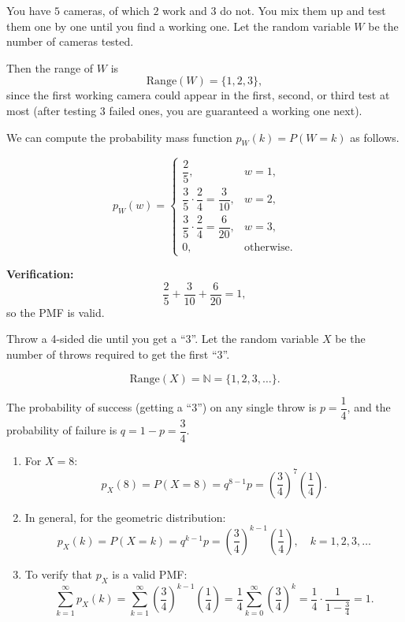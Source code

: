 \begin{eg}
You have \(5\) cameras, of which \(2\) work and \(3\) do not.  
You mix them up and test them one by one until you find a working one.  
Let the random variable \(W\) be the number of cameras tested.

Then the range of \(W\) is
\[
\text{Range}(W) = \{1,2,3\},
\]
since the first working camera could appear in the first, second, or third test at most (after testing \(3\) failed ones, you are guaranteed a working one next).

We can compute the probability mass function \(p_W(k) = P(W = k)\) as follows.

\[
p_W(w) =
\begin{cases}
\dfrac{2}{5}, & w = 1, \\[1em]
\dfrac{3}{5}\cdot\dfrac{2}{4} = \dfrac{3}{10}, & w = 2, \\[1em]
\dfrac{3}{5}\cdot\dfrac{2}{4} = \dfrac{6}{20}, & w = 3, \\[1em]
0, & \text{otherwise.}
\end{cases}
\]

\textbf{Verification:}
\[
\frac{2}{5} + \frac{3}{10} + \frac{6}{20} = 1,
\]
so the PMF is valid.
\end{eg}

\begin{eg}
    Throw a 4-sided die until you get a ``3''.  
    Let the random variable \( X \) be the number of throws required to get the first ``3''.  

    \[
    \text{Range}(X) = \mathbb{N} = \{1, 2, 3, \dots\}.
    \]

    The probability of success (getting a ``3'') on any single throw is \( p = \dfrac{1}{4} \),  
    and the probability of failure is \( q = 1 - p = \dfrac{3}{4} \).

    \begin{enumerate}[label=(\alph*)]
        \item For \( X = 8 \):
        \[
        p_X(8) = P(X = 8) = q^{8-1}p = \left(\dfrac{3}{4}\right)^{7} \left(\dfrac{1}{4}\right).
        \]

        \item In general, for the geometric distribution:
        \[
        p_X(k) = P(X = k) = q^{k-1}p = 
        \left( \dfrac{3}{4} \right)^{k-1} 
        \left( \dfrac{1}{4} \right),
        \quad k = 1, 2, 3, \dots
        \]

        \item To verify that \( p_X \) is a valid PMF:
        \[
        \sum_{k=1}^{\infty} p_X(k)
        = \sum_{k=1}^{\infty} \left( \dfrac{3}{4} \right)^{k-1} 
        \left( \dfrac{1}{4} \right)
        = \dfrac{1}{4} \sum_{k=0}^{\infty} 
        \left( \dfrac{3}{4} \right)^k
        = \dfrac{1}{4} \cdot \dfrac{1}{1 - \frac{3}{4}}
        = 1.
        \]
    \end{enumerate}
\end{eg}


